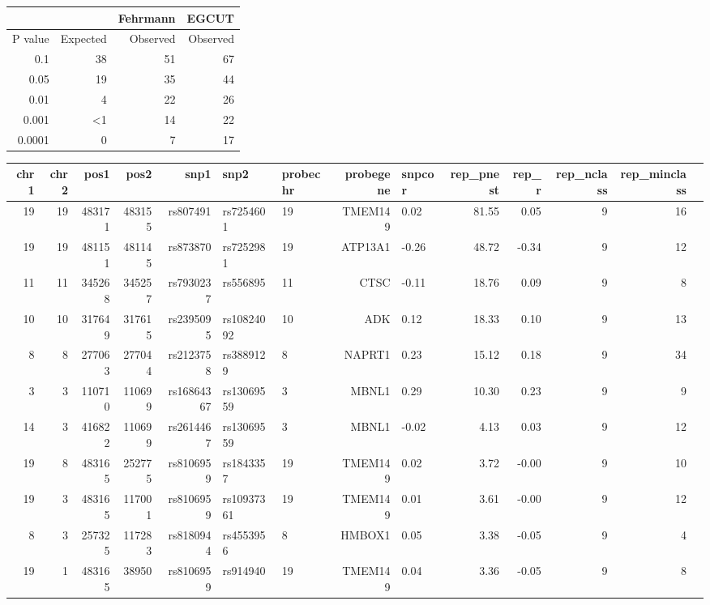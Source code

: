 \documentclass[paper=a4, fontsize=11pt]{scrartcl}	%
\numberwithin{equation}{section}									%
\numberwithin{figure}{section}										%
\numberwithin{table}{section}										%
\begin{document}
\begin{table}[ht]
	\centering
	\begin{tabular}{rrrr}
	\hline
	& & Fehrmann & EGCUT \\
	\hline
	P value & Expected & Observed & Observed \\
	\hline	  
	0.1 & 38 & 51 & 67 \\
	0.05 & 19 & 35 & 44 \\
	0.01 & 4 & 22 & 26 \\
	0.001 & <1 & 14 & 22 \\
	0.0001 & ~0 & 7 & 17 \\
	\hline
	\end{tabular}
\end{table}


\begin{table}
\centering
{\footnotesize
\begin{tabular}{rrrrrllrlrrrrr}
  \hline
chr1 & chr2 & pos1 & pos2 & snp1 & snp2 & probechr & probegene & snpcor & rep\_pnest & rep\_r & rep\_nclass & rep\_minclass \\ 
  \hline
19 &  19 & 483171 & 483155 & rs807491 & rs7254601 &  19 & TMEM149 & 0.02 & 81.55 & 0.05 &   9 &  16 \\ 
19 &  19 & 481151 & 481145 & rs873870 & rs7252981 &  19 & ATP13A1 & -0.26 & 48.72 & -0.34 &   9 &  12 \\ 
11 &  11 & 345268 & 345257 & rs7930237 & rs556895 &  11 & CTSC & -0.11 & 18.76 & 0.09 &   9 &   8 \\ 
10 &  10 & 317649 & 317615 & rs2395095 & rs10824092 &  10 & ADK & 0.12 & 18.33 & 0.10 &   9 &  13 \\ 
8 &   8 & 277063 & 277044 & rs2123758 & rs3889129 &   8 & NAPRT1 & 0.23 & 15.12 & 0.18 &   9 &  34 \\ 
3 &   3 & 110710 & 110699 & rs16864367 & rs13069559 &   3 & MBNL1 & 0.29 & 10.30 & 0.23 &   9 &   9 \\ 
14 &   3 & 416822 & 110699 & rs2614467 & rs13069559 &   3 & MBNL1 & -0.02 & 4.13 & 0.03 &   9 &  12 \\ 
19 &   8 & 483165 & 252775 & rs8106959 & rs1843357 &  19 & TMEM149 & 0.02 & 3.72 & -0.00 &   9 &  10 \\ 
19 &   3 & 483165 & 117001 & rs8106959 & rs10937361 &  19 & TMEM149 & 0.01 & 3.61 & -0.00 &   9 &  12 \\ 
8 &   3 & 257325 & 117283 & rs8180944 & rs4553956 &   8 & HMBOX1 & 0.05 & 3.38 & -0.05 &   9 &   4 \\ 
19 &   1 & 483165 & 38950 & rs8106959 & rs914940 &  19 & TMEM149 & 0.04 & 3.36 & -0.05 &   9 &   8 \\ 

\end{tabular}}
\end{table}
\end{document}
